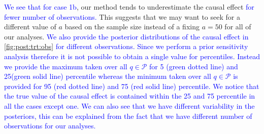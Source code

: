 \documentclass[preprint,12pt]{elsarticle}
\newcommand{\added}[1]{\textcolor{blue}{#1}}
\begin{document}
\added{We see that for case 1b}, our method tends
to underestimate the causal effect \added{for fewer number of observations.}
This suggests that
we may want to seek for a different value of $a$ based on the sample size
instead of a fixing $a=50$ for all of our analyses. \added{We also provide the posterior distributions of the causal effect in \cref{fig:post:trt:obs} for different observations. Since we perform
a prior sensitivity analysis therefore it is not possible to obtain a single value for percentiles. Instead we provide the maximum taken over all $q\in\mathcal{P}$ for 5 (green dotted line) and 25(green solid line) percentile whereas the minimum taken over all $q\in\mathcal{P}$ is provided for 95 (red dotted line) and 75 (red solid line) percentile. We notice that the true value of the causal effect is contained within the 25 and 75 percentile in all the cases except one. We can also see that we have different variability in the posteriors, this can be explained from the fact that we have different number of observations for our analyses.} 
\end{document}
